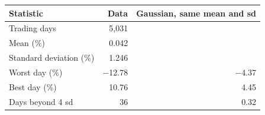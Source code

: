 \begin{tabular}{lrr}
\toprule
Statistic & Data & Gaussian, same mean and sd \\
\midrule
Trading days & 5,031 &  \\
Mean (\%) & 0.042 &  \\
Standard deviation (\%) & 1.246 &  \\
Worst day (\%) & $-$12.78 & $-$4.37 \\
Best day (\%) & 10.76 & 4.45 \\
Days beyond 4 sd & 36 & 0.32 \\
\bottomrule
\end{tabular}
